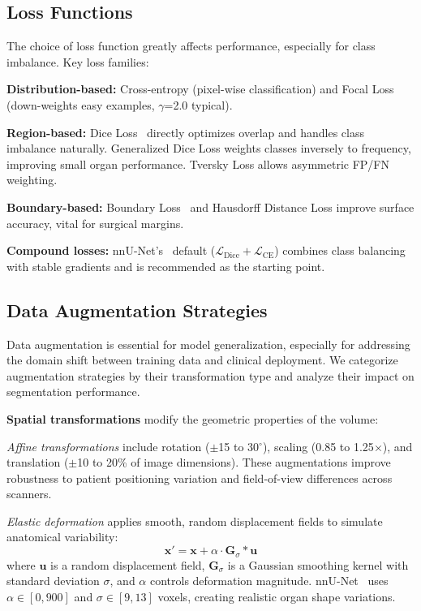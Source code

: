 \documentclass[conference]{IEEEtran}
\begin{document}
\subsection{Loss Functions}
\label{sec:loss_functions}

The choice of loss function greatly affects performance, especially for class imbalance. Key loss families:

\textbf{Distribution-based:} Cross-entropy (pixel-wise classification) and Focal Loss~\cite{lin2017focal} (down-weights easy examples, $\gamma$=2.0 typical).

\textbf{Region-based:} Dice Loss~\cite{milletari2016vnet} directly optimizes overlap and handles class imbalance naturally. Generalized Dice Loss weights classes inversely to frequency, improving small organ performance. Tversky Loss allows asymmetric FP/FN weighting.

\textbf{Boundary-based:} Boundary Loss~\cite{kervadec2019boundary} and Hausdorff Distance Loss improve surface accuracy, vital for surgical margins.

\textbf{Compound losses:} nnU-Net's~\cite{isensee2021nnunet} default ($\mathcal{L}_{\text{Dice}} + \mathcal{L}_{\text{CE}}$) combines class balancing with stable gradients and is recommended as the starting point.

\subsection{Data Augmentation Strategies}
\label{sec:augmentation}

Data augmentation is essential for model generalization, especially for addressing the domain shift between training data and clinical deployment. We categorize augmentation strategies by their transformation type and analyze their impact on segmentation performance.

\textbf{Spatial transformations} modify the geometric properties of the volume:

\emph{Affine transformations} include rotation ($\pm$15 to 30$^\circ$), scaling (0.85 to 1.25$\times$), and translation ($\pm$10 to 20\% of image dimensions). These augmentations improve robustness to patient positioning variation and field-of-view differences across scanners.

\emph{Elastic deformation} applies smooth, random displacement fields to simulate anatomical variability:
\begin{equation*}
\mathbf{x}' = \mathbf{x} + \alpha \cdot \mathbf{G}_\sigma * \mathbf{u}
\end{equation*}
where $\mathbf{u}$ is a random displacement field, $\mathbf{G}_\sigma$ is a Gaussian smoothing kernel with standard deviation $\sigma$, and $\alpha$ controls deformation magnitude. nnU-Net~\cite{isensee2021nnunet} uses $\alpha \in [0, 900]$ and $\sigma \in [9, 13]$ voxels, creating realistic organ shape variations.
\end{document}
